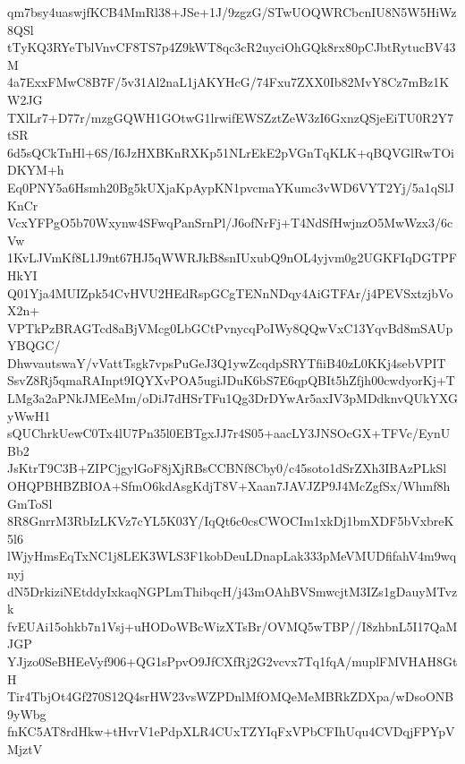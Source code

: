 qm7bsy4uaswjfKCB4MmRl38+JSe+1J/9zgzG/STwUOQWRCbcnIU8N5W5HiWz8QSl
tTyKQ3RYeTblVnvCF8TS7p4Z9kWT8qc3cR2uyciOhGQk8rx80pCJbtRytucBV43M
4a7ExxFMwC8B7F/5v31Al2naL1jAKYHcG/74Fxu7ZXX0Ib82MvY8Cz7mBz1KW2JG
TXlLr7+D77r/mzgGQWH1GOtwG1lrwifEWSZztZeW3zI6GxnzQSjeEiTU0R2Y7tSR
6d5sQCkTnHl+6S/I6JzHXBKnRXKp51NLrEkE2pVGnTqKLK+qBQVGlRwTOiDKYM+h
Eq0PNY5a6Hsmh20Bg5kUXjaKpAypKN1pvcmaYKumc3vWD6VYT2Yj/5a1qSlJKnCr
VcxYFPgO5b70Wxynw4SFwqPanSrnPl/J6ofNrFj+T4NdSfHwjnzO5MwWzx3/6cVw
1KvLJVmKf8L1J9nt67HJ5qWWRJkB8snIUxubQ9nOL4yjvm0g2UGKFIqDGTPFHkYI
Q01Yja4MUIZpk54CvHVU2HEdRspGCgTENnNDqy4AiGTFAr/j4PEVSxtzjbVoX2n+
VPTkPzBRAGTcd8aBjVMcg0LbGCtPvnycqPoIWy8QQwVxC13YqvBd8mSAUpYBQGC/
DhwvautswaY/vVattTsgk7vpsPuGeJ3Q1ywZcqdpSRYTfiiB40zL0KKj4sebVPIT
SsvZ8Rj5qmaRAInpt9IQYXvPOA5ugiJDuK6bS7E6qpQBIt5hZfjh00cwdyorKj+T
LMg3a2aPNkJMEeMm/oDiJ7dHSrTFu1Qg3DrDYwAr5axIV3pMDdknvQUkYXGyWwH1
sQUChrkUewC0Tx4lU7Pn35l0EBTgxJJ7r4S05+aacLY3JNSOcGX+TFVc/EynUBb2
JsKtrT9C3B+ZIPCjgylGoF8jXjRBsCCBNf8Cby0/c45soto1dSrZXh3IBAzPLkSl
OHQPBHBZBIOA+SfmO6kdAsgKdjT8V+Xaan7JAVJZP9J4McZgfSx/Whmf8hGmToSl
8R8GnrrM3RbIzLKVz7cYL5K03Y/IqQt6c0csCWOCIm1xkDj1bmXDF5bVxbreK5l6
lWjyHmsEqTxNC1j8LEK3WLS3F1kobDeuLDnapLak333pMeVMUDfifahV4m9wqnyj
dN5DrkiziNEtddyIxkaqNGPLmThibqcH/j43mOAhBVSmwcjtM3IZs1gDauyMTvzk
fvEUAi15ohkb7n1Vsj+uHODoWBcWizXTsBr/OVMQ5wTBP//I8zhbnL5I17QaMJGP
YJjzo0SeBHEeVyf906+QG1sPpvO9JfCXfRj2G2vcvx7Tq1fqA/muplFMVHAH8GtH
Tir4TbjOt4Gf270S12Q4srHW23vsWZPDnlMfOMQeMeMBRkZDXpa/wDsoONB9yWbg
fnKC5AT8rdHkw+tHvrV1ePdpXLR4CUxTZYIqFxVPbCFIhUqu4CVDqjFPYpVMjztV
